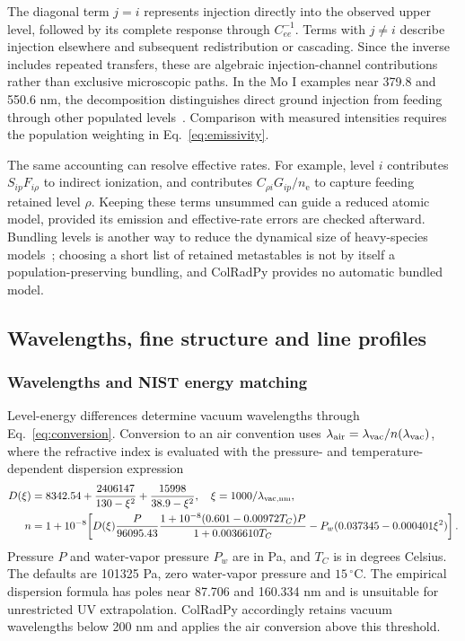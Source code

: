 \documentclass[11pt,a4paper]{article}
\newcommand{\nelec}{n_{\mathrm e}}
\numberwithin{equation}{section}
\begin{document}
The diagonal term $j=i$ represents injection directly into the observed
upper level, followed by its complete response through $C_{ee}^{-1}$.
Terms with $j\ne i$ describe injection elsewhere and subsequent
redistribution or cascading. Since the inverse includes repeated
transfers, these are algebraic injection-channel contributions rather
than exclusive microscopic paths. In the Mo I examples near 379.8 and
550.6 nm, the decomposition distinguishes direct ground injection from
feeding through other populated levels~\cite{johnson}. Comparison with
measured intensities requires the population weighting in
Eq.~\eqref{eq:emissivity}.

The same accounting can resolve effective rates. For example, level $i$
contributes $S_{ip}F_{i\rho}$ to indirect ionization, and contributes
$C_{\rho i}G_{ip}/\nelec$ to capture feeding retained level $\rho$. Keeping
these terms unsummed can guide a reduced atomic model, provided its emission
and effective-rate errors are checked afterward. Bundling levels is another
way to reduce the dynamical size of heavy-species models~\cite{johnson};
choosing a short list of retained metastables is not by itself a
population-preserving bundling, and ColRadPy provides no automatic bundled
model.

\subsection{Wavelengths, fine structure and line profiles}\label{sec:spectra}

\subsubsection{Wavelengths and NIST energy matching}

Level-energy differences determine vacuum wavelengths through
Eq.~\eqref{eq:conversion}. Conversion to an air convention uses
$\lambda_{\rm air}=\lambda_{\rm vac}/n(\lambda_{\rm vac})$, where
the refractive index is evaluated with the pressure- and
temperature-dependent dispersion expression
\begin{align}
 D(\xi)&=8342.54+\frac{2406147}{130-\xi^2}
                       +\frac{15998}{38.9-\xi^2},\quad
 \xi=1000/\lambda_{\rm vac,nm},\\
 n&=1+10^{-8}\!\left[D(\xi)\frac{P}{96095.43}
 \frac{1+10^{-8}(0.601-0.00972T_C)P}{1+0.0036610T_C}
 -P_w(0.037345-0.000401\xi^2)\right].
\end{align}
Pressure $P$ and water-vapor pressure $P_w$ are in Pa, and $T_C$ is
in degrees Celsius. The defaults are 101325 Pa, zero water-vapor
pressure and $15\,^{\circ}$C. The empirical dispersion formula has
poles near 87.706 and 160.334 nm and is unsuitable for unrestricted
UV extrapolation. ColRadPy accordingly retains vacuum wavelengths
below 200 nm and applies the air conversion above this threshold.
\end{document}
